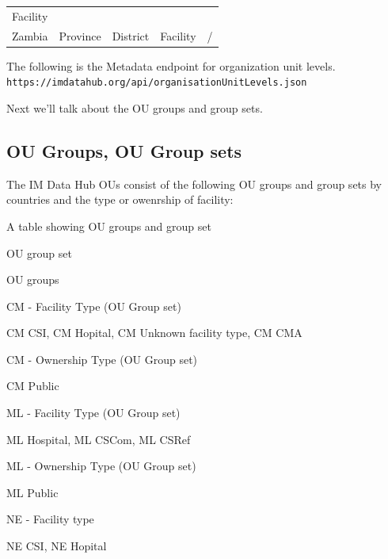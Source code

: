 \documentclass[]{book}
\begin{document}
\begin{longtable}[]{@{}lllll@{}}
\begin{minipage}[t]{0.20\columnwidth}
Facility\strut
\end{minipage}\tabularnewline
\begin{minipage}[t]{0.07\columnwidth}\raggedright
Zambia\strut
\end{minipage} & \begin{minipage}[t]{0.20\columnwidth}\raggedright
Province\strut
\end{minipage} & \begin{minipage}[t]{0.20\columnwidth}\raggedright
District\strut
\end{minipage} & \begin{minipage}[t]{0.20\columnwidth}\raggedright
Facility\strut
\end{minipage} & \begin{minipage}[t]{0.20\columnwidth}\raggedright
/\strut
\end{minipage}\tabularnewline
\bottomrule
\end{longtable}

The following is the Metadata endpoint for organization unit levels.
\texttt{https://imdatahub.org/api/organisationUnitLevels.json}

Next we'll talk about the OU groups and group sets.

\hypertarget{ougroup}{%
\subsection{OU Groups, OU Group sets}\label{ougroup}}

The IM Data Hub OUs consist of the following OU groups and group sets by countries and the type or owenrship of facility:

\label{tab:unnamed-chunk-13}A table showing OU groups and group set

OU group set

OU groups

CM - Facility Type (OU Group set)

CM CSI, CM Hopital, CM Unknown facility type, CM CMA

CM - Ownership Type (OU Group set)

CM Public

ML - Facility Type (OU Group set)

ML Hospital, ML CSCom, ML CSRef

ML - Ownership Type (OU Group set)

ML Public

NE - Facility type

NE CSI, NE Hopital
\end{document}
